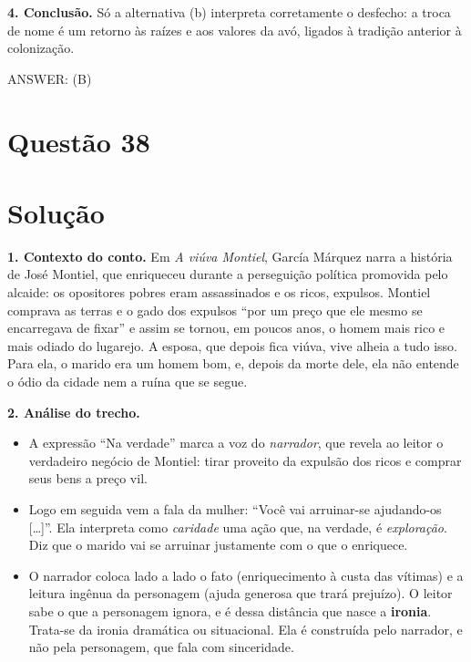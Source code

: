 \documentclass{article}%
\begin{document}
\textbf{4. Conclusão.} Só a alternativa (b) interpreta corretamente o desfecho: a troca de nome é um retorno às raízes e aos valores da avó, ligados à tradição anterior à colonização.

ANSWER: (B)%
\newpage%
\section*{Questão 38}

\section*{Solução}

\textbf{1. Contexto do conto.} Em \emph{A viúva Montiel}, García Márquez narra a história de José Montiel, que enriqueceu durante a perseguição política promovida pelo alcaide: os opositores pobres eram assassinados e os ricos, expulsos. Montiel comprava as terras e o gado dos expulsos ``por um preço que ele mesmo se encarregava de fixar'' e assim se tornou, em poucos anos, o homem mais rico e mais odiado do lugarejo. A esposa, que depois fica viúva, vive alheia a tudo isso. Para ela, o marido era um homem bom, e, depois da morte dele, ela não entende o ódio da cidade nem a ruína que se segue.

\textbf{2. Análise do trecho.}
\begin{itemize}
\item A expressão ``Na verdade'' marca a voz do \emph{narrador}, que revela ao leitor o verdadeiro negócio de Montiel: tirar proveito da expulsão dos ricos e comprar seus bens a preço vil.
\item Logo em seguida vem a fala da mulher: ``Você vai arruinar-se ajudando-os [\ldots]''. Ela interpreta como \emph{caridade} uma ação que, na verdade, é \emph{exploração}. Diz que o marido vai se arruinar justamente com o que o enriquece.
\item O narrador coloca lado a lado o fato (enriquecimento à custa das vítimas) e a leitura ingênua da personagem (ajuda generosa que trará prejuízo). O leitor sabe o que a personagem ignora, e é dessa distância que nasce a \textbf{ironia}. Trata-se da ironia dramática ou situacional. Ela é construída pelo narrador, e não pela personagem, que fala com sinceridade.
\end{itemize}
\end{document}
